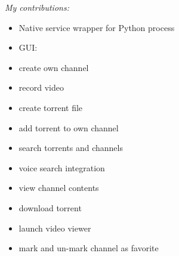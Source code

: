 \emph{My contributions:}
\begin{itemize}
	\item Native service wrapper for Python process
	\item GUI:
	\item create own channel
	\item record video
	\item create torrent file
	\item add torrent to own channel
	\item search torrents and channels
	\item voice search integration
	\item view channel contents
	\item download torrent
	\item launch video viewer
	\item mark and un-mark channel as favorite
\end{itemize}


